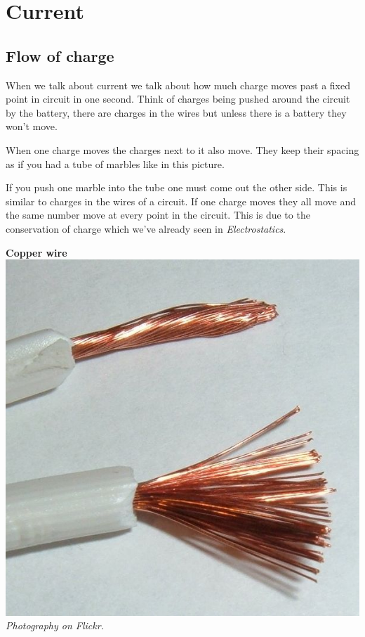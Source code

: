 \section{Current}

\subsection*{Flow of charge}

When we talk about current we talk about how much charge moves past a fixed point in circuit in one second. Think of charges being pushed around the circuit by the battery, there are charges in the wires but unless there is a battery they won't move.\\
\begin{minipage}{.5\textwidth}
 When one charge moves the charges next to it also move. They keep their spacing as if you had a tube of marbles like in this picture.
\begin{center}
\end{center}
If you push one marble into the tube one must come out the other side. This is similar to charges in the wires of a circuit.
If one charge moves they all move and the same number move at every point in the circuit. This is due to the conservation of charge which we've already seen in \textsl{Electrostatics}.
 \end{minipage}
\begin{minipage}{.5\textwidth}
\begin{center}
\textbf{Copper wire}\\
\includegraphics[width=.8\textwidth]{photos/copperwire.jpg}\\
\textit{Photography on Flickr.}
\end{center}  
\end{minipage}

